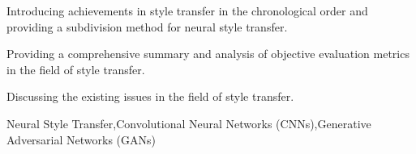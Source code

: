 \documentclass[preprint,12pt]{elsarticle}
\begin{document}
\begin{frontmatter}
\begin{highlights}
\item  Introducing achievements in style transfer in the chronological order and providing a subdivision method for neural style transfer.
\item Providing a comprehensive summary and analysis of objective evaluation metrics in the field of style transfer.
\item Discussing the existing issues in the field of style transfer.
\end{highlights}
\begin{keyword}
Neural Style Transfer\sep Convolutional Neural Networks (CNNs)\sep Generative Adversarial Networks (GANs)


\end{keyword}

\end{frontmatter}
















% 







\end{document}
